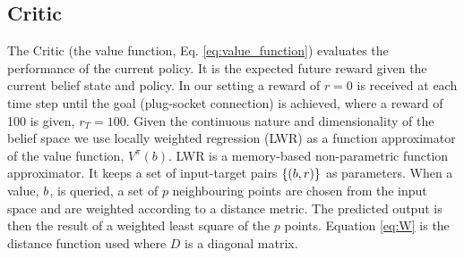 
\subsection{Critic}

% 
%


The Critic (the value function, Eq. \ref{eq:value_function}) evaluates 
the performance of the current policy. It is the expected future reward given the current 
belief state and policy.
In our setting a reward of $r=0$ is received at each time step
until the goal (plug-socket connection) is achieved, where a reward of 100 is given, $r_{T}=100$.
Given the continuous nature and dimensionality of the belief space we use locally weighted regression \cite{Atkeson97locallyweighted}
(LWR) as a function approximator of the value function, $V^{\pi}(b)$. LWR is a memory-based non-parametric function 
approximator. It keeps a set of input-target pairs $\{(b,r)\}$ as parameters. When a value, $b$, is 
queried, a set of $p$ neighbouring points are chosen from the input space and are 
weighted according to a distance metric. The predicted output is then the result of a weighted 
least square of the $p$ points. Equation \ref{eq:W} is the distance function used where 
$D$ is a diagonal matrix.

